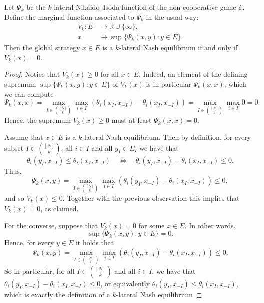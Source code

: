 \documentclass[10pt,a4paper]{amsart}
\newcommand{\Ecal}{\mathcal{E}}
\begin{document}
\begin{theorem}\label{thm:MultilateralNikaidoIsodaTheorem}
	Let $\Psi_k$ be the $k$-lateral Nikaido--Isoda function of the non-cooperative game $\Ecal$.
	Define the marginal function associated to $\Psi_k$ in the usual way:
	\begin{align*}
		V_k\colon E & \longrightarrow \mathbb{R} \cup \{\infty\}, \\
		x           & \longmapsto \sup\{\Psi_k(x,y) : y\in E\}.
	\end{align*}
	Then the global strategy $x\in E$ is a $k$-lateral Nash equilibrium if and only if $V_k(x)=0$.
\end{theorem}

\begin{proof}
	Notice that $V_k(x) \geq 0$ for all $x\in E$. Indeed, an element of the defining supremum $\sup\{\Psi_k(x,y) : y\in E\}$ of $V_k(x)$ is in particular $\Psi_k(x,x)$, which we can compute
	\begin{displaymath}
		\Psi_k(x,x) =\max_{I\in\binom{[N]}{k}}\max_{i\in I}\left(\theta_i(x_I, x_{-I}) - \theta_i(x_I, x_{-I})\right) = \max_{I\in\binom{[N]}{k}}\max_{i\in I} 0 = 0.
	\end{displaymath}
	Hence, the supremum $V_k(x) \geq 0$ must at least $\Psi_k(x,x)=0$.

	\medskip
	Assume that $x\in E$ is a $k$-lateral Nash equilibrium. Then by definition, for every subset $I\in\binom{[N]}{k}$, all $i\in I$ and all $y_I\in E_I$ we have that
	\begin{displaymath}
		\theta_i(y_I,x_{-I}) \leq \theta_i(x_I,x_{-I}) \quad \Longleftrightarrow \quad \theta_i(y_I,x_{-I}) - \theta_i(x_I,x_{-I}) \leq 0.
	\end{displaymath}
	Thus,
	\begin{displaymath}
		\Psi_k(x,y)=\max_{I\in\binom{[N]}{k}}\max_{i\in I}\left(\theta_i(y_I, x_{-I}) - \theta_i(x_I, x_{-I})\right) \leq 0,
	\end{displaymath}
	and so $V_k(x)\leq 0$.
	Together with the previous observation this implies that $V_k(x)= 0$, as claimed.

	\medskip
	For the converse, suppose that $V_k(x)=0$ for some $x\in E$.
	In other words,
	\begin{displaymath}
		\sup\{\Psi_k(x,y) : y\in E\}=0.
	\end{displaymath}
	Hence, for every $y\in E$ it holds that
	\begin{displaymath}
		\Psi_k(x,y) =\max_{I\in\binom{[N]}{k}}\max_{i\in I}\left(\theta_i(y_I, x_{-I}) - \theta_i(x_I, x_{-I})\right) \leq 0.
	\end{displaymath}
	So in particular, for all $I\in\binom{[N]}{k}$ and all $i\in I$, we have that $\theta_i(y_I, x_{-I}) - \theta_i(x_I, x_{-I})\leq 0$, or equivalently $\theta_i(y_I, x_{-I}) \leq\theta_i(x_I, x_{-I})$, which is exactly the definition of a $k$-lateral Nash equilibrium
\end{proof}
\end{document}
